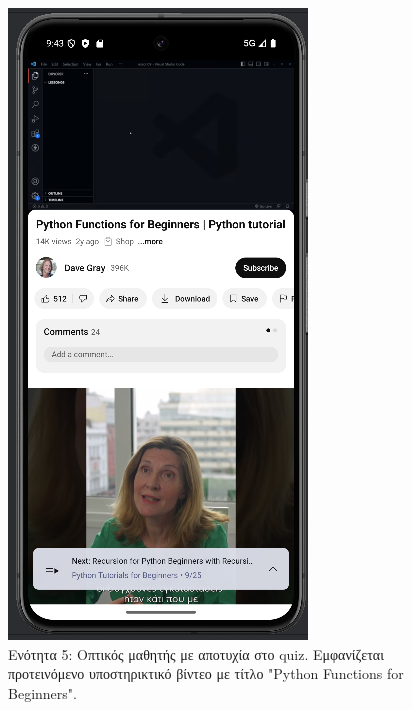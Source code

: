 \documentclass[11pt]{report}
\begin{document}
\begin{figure}[H]
  \centering
  \includegraphics[width=\linewidth, height=0.35\textheight, keepaspectratio]{Figures/εικόνα (13).png}
  \caption{Ενότητα 5: Οπτικός μαθητής με αποτυχία στο quiz. Εμφανίζεται προτεινόμενο υποστηρικτικό βίντεο με τίτλο "Python Functions for Beginners".}
\end{figure}
\end{document}
